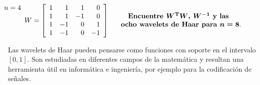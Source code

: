 \documentclass[12pt,a4paper]{article}
\newcommand{\bi}[1]{\hbox{\boldmath$#1$}}
\newcommand\1{\mbox{\,\vrule height-0.8pt depth1.0pt width2pc\,}}
\newcommand\2{\mbox{\,\vrule height-0.8pt depth1.0pt width1pc\,}}
\DeclareRobustCommand\transp{^{\mathrm{T}}}
\begin{document}
\begin{enumerate}
\vspace{-3pt}
$$
\hspace{-30pt}\begin{array}{c}n=4\\\\\\\\\end{array}
W=\left[\begin{array}{rrrr}1&1&1&0\\1&1&-1&0\\1&-1&0&1\\1&-1&0&-1\\\end{array}\right]\quad\begin{array}{c}\textbf{Encuentre }\bi{W\transp W}\textbf{, }\bi{W^{-1}}\textbf{ y las }\\\textbf{ ocho wavelets de Haar para }\bi{n=8}.\\\end{array}
$$

Las wavelets de Haar pueden pensarse como funciones con soporte en el intervalo $[0,1]$. Son estudiadas en diferentes campos de la matemática y resultan una herramienta útil en informática e ingeniería, por ejemplo para la codificación de señales.



\end{enumerate}
\end{document}
